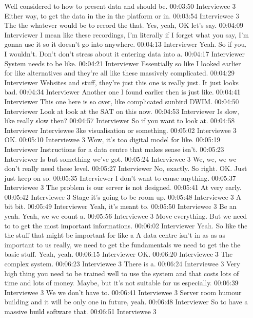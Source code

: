 Well considered to how to present data and should be.
00:03:50 Interviewee 3
Either way, to get the data in the in the platform or in.
00:03:54 Interviewee 3
The the whatever would be to record the that. Yes, yeah, OK let's say.
00:04:09 Interviewer
I mean like these recordings, I'm literally if I forget what you say, I'm gonna use it so it doesn't go into anywhere.
00:04:13 Interviewer
Yeah. So if you, I wouldn't. Don't don't stress about it entering data into a.
00:04:17 Interviewer
System needs to be like.
00:04:21 Interviewer
Essentially so like I looked earlier for like alternatives and they're all like these massively complicated.
00:04:29 Interviewer
Websites and stuff, they're just this one is really just. It just looks bad.
00:04:34 Interviewer
Another one I found earlier then is just like.
00:04:41 Interviewer
This one here is so over, like complicated sunbird DWIM.
00:04:50 Interviewer
Look at look at the SAT on this now.
00:04:53 Interviewer
Is slow, like really slow then?
00:04:57 Interviewer
So if you want to look at.
00:04:58 Interviewer
Interviewee 3ke visualisation or something.
00:05:02 Interviewee 3
OK.
00:05:10 Interviewee 3
Wow, it's too digital model for like.
00:05:19 Interviewer
Instructions for a data centre that makes sense isn't.
00:05:23 Interviewer
Is but something we've got.
00:05:24 Interviewee 3
We, we, we we don't really need these level.
00:05:27 Interviewer
No, exactly. So right. OK. Just just keep on so.
00:05:35 Interviewer
I don't want to cause anything.
00:05:37 Interviewee 3
The problem is our server is not designed.
00:05:41
At very early.
00:05:42 Interviewee 3
Stage it's going to be room up.
00:05:48 Interviewee 3
A bit bit.
00:05:49 Interviewer
Yeah, it's meant to.
00:05:50 Interviewee 3
Be an yeah. Yeah, we we count a.
00:05:56 Interviewee 3
Move everything. But we need to to get the most important informations.
00:06:02 Interviewer
Yeah. So like the the stuff that might be important for like a A data centre isn't in as as as important to us really, we need to get the fundamentals we need to get the the basic stuff. Yeah, yeah.
00:06:15 Interviewer
OK.
00:06:20 Interviewee 3
The complex system.
00:06:23 Interviewee 3
There is a.
00:06:24 Interviewee 3
Very high thing you need to be trained well to use the system and that costs lots of time and lots of money. Maybe, but it's not suitable for us especially.
00:06:39 Interviewee 3
We we don't have to.
00:06:41 Interviewee 3
Server room humour building and it will be only one in future, yeah.
00:06:48 Interviewer
So to have a massive build software that.
00:06:51 Interviewee 3
